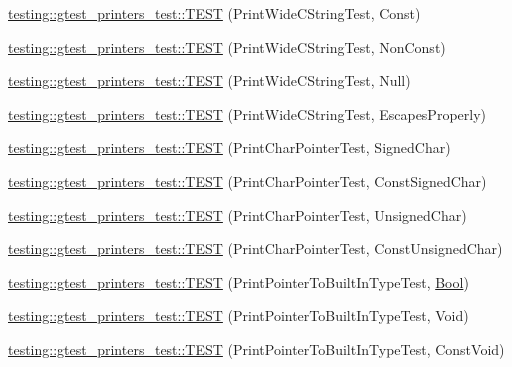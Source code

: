 \begin{DoxyCompactItemize}
\item 
\mbox{\hyperlink{namespacetesting_1_1gtest__printers__test_a4caa1f81979cdc6f5ada95e01a4fae63}{testing\+::gtest\+\_\+printers\+\_\+test\+::\+T\+E\+ST}} (Print\+Wide\+C\+String\+Test, Const)
\item 
\mbox{\hyperlink{namespacetesting_1_1gtest__printers__test_a8812b5f088e13083ebb8a7e35fbcdae7}{testing\+::gtest\+\_\+printers\+\_\+test\+::\+T\+E\+ST}} (Print\+Wide\+C\+String\+Test, Non\+Const)
\item 
\mbox{\hyperlink{namespacetesting_1_1gtest__printers__test_acd1267d49d61ad53b2b8a88f68fca3a7}{testing\+::gtest\+\_\+printers\+\_\+test\+::\+T\+E\+ST}} (Print\+Wide\+C\+String\+Test, Null)
\item 
\mbox{\hyperlink{namespacetesting_1_1gtest__printers__test_aa80d6bb47e6bf997dacf0c75322d12cf}{testing\+::gtest\+\_\+printers\+\_\+test\+::\+T\+E\+ST}} (Print\+Wide\+C\+String\+Test, Escapes\+Properly)
\item 
\mbox{\hyperlink{namespacetesting_1_1gtest__printers__test_acd7a56709621a91dca669023d192bdc7}{testing\+::gtest\+\_\+printers\+\_\+test\+::\+T\+E\+ST}} (Print\+Char\+Pointer\+Test, Signed\+Char)
\item 
\mbox{\hyperlink{namespacetesting_1_1gtest__printers__test_ae854b0ca4d06ffc273c391f262884681}{testing\+::gtest\+\_\+printers\+\_\+test\+::\+T\+E\+ST}} (Print\+Char\+Pointer\+Test, Const\+Signed\+Char)
\item 
\mbox{\hyperlink{namespacetesting_1_1gtest__printers__test_afb9a6a26323b287b7666b6adb5bdb149}{testing\+::gtest\+\_\+printers\+\_\+test\+::\+T\+E\+ST}} (Print\+Char\+Pointer\+Test, Unsigned\+Char)
\item 
\mbox{\hyperlink{namespacetesting_1_1gtest__printers__test_aa0487f8fd5052f7d6afe2b18ad7931f9}{testing\+::gtest\+\_\+printers\+\_\+test\+::\+T\+E\+ST}} (Print\+Char\+Pointer\+Test, Const\+Unsigned\+Char)
\item 
\mbox{\hyperlink{namespacetesting_1_1gtest__printers__test_ad08dcd672b1e66a802a564eb974c400a}{testing\+::gtest\+\_\+printers\+\_\+test\+::\+T\+E\+ST}} (Print\+Pointer\+To\+Built\+In\+Type\+Test, \mbox{\hyperlink{structBool}{Bool}})
\item 
\mbox{\hyperlink{namespacetesting_1_1gtest__printers__test_ac6d8b84db9386b399eb431b5b1668e87}{testing\+::gtest\+\_\+printers\+\_\+test\+::\+T\+E\+ST}} (Print\+Pointer\+To\+Built\+In\+Type\+Test, Void)
\item 
\mbox{\hyperlink{namespacetesting_1_1gtest__printers__test_a8819fb42392faae72e8bc594d498085d}{testing\+::gtest\+\_\+printers\+\_\+test\+::\+T\+E\+ST}} (Print\+Pointer\+To\+Built\+In\+Type\+Test, Const\+Void)

\end{DoxyCompactItemize}
